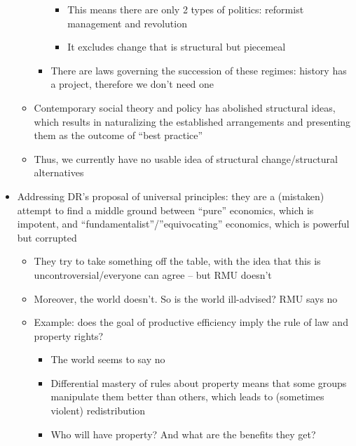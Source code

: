 \begin{itemize}
\begin{itemize}
\begin{itemize}
      \begin{itemize}
      \tightlist
      \item
        This means there are only 2 types of politics: reformist
        management and revolution
      \item
        It excludes change that is structural but piecemeal
      \end{itemize}
    \item
      There are laws governing the succession of these regimes: history
      has a project, therefore we don't need one
    \end{itemize}
  \item
    Contemporary social theory and policy has abolished structural
    ideas, which results in naturalizing the established arrangements
    and presenting them as the outcome of ``best practice''
  \item
    Thus, we currently have no usable idea of structural
    change/structural alternatives
  \end{itemize}
\item
  Addressing DR's proposal of universal principles: they are a
  (mistaken) attempt to find a middle ground between ``pure'' economics,
  which is impotent, and ``fundamentalist''/''equivocating'' economics,
  which is powerful but corrupted

  \begin{itemize}
  \tightlist
  \item
    They try to take something off the table, with the idea that this is
    uncontroversial/everyone can agree -- but RMU doesn't
  \item
    Moreover, the world doesn't. So is the world ill-advised? RMU says
    no
  \item
    Example: does the goal of productive efficiency imply the rule of
    law and property rights?

    \begin{itemize}
    \tightlist
    \item
      The world seems to say no
    \item
      Differential mastery of rules about property means that some
      groups manipulate them better than others, which leads to
      (sometimes violent) redistribution
    \item
      Who will have property? And what are the benefits they get?


\end{itemize}
\end{itemize}
\end{itemize}

